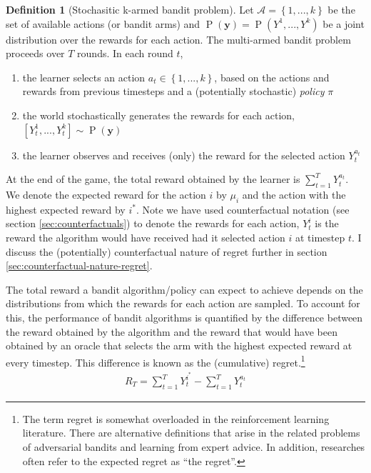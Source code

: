 \documentclass[11pt,a4paper,twoside]{report}
\newcommand{\actionspace}{\mathcal{A}}
\newcommand{\set}[1]{\left\{#1\right\}}
\newcommand{\eqn}[1]{\begin{align}#1\end{align}}
\renewcommand{\P}[1]{\operatorname{P}\left(#1\right)}
\newcommand{\cf}[2]{{#1}^{#2}}
\newcommand{\cfb}[2]{{#1}_t^{#2}} %
\renewcommand{\vec}[1]{\boldsymbol{#1}}
\newcommand{\rawregret}{R_{T}} %
\newcommand{\quotes}[1]{``#1''}
\theoremstyle{plain}
\theoremstyle{definition}
\newtheorem{definition}[theorem]{Definition}
\begin{document}
\vspace{0.5cm}
\begin{definition}[Stochasitic k-armed bandit problem]
Let $\actionspace = \set{1,...,k}$ be the set of available actions (or bandit arms) and $\P{\vec{y}} = \P{\cf{Y}{1},...,\cf{Y}{k}}$ be a joint distribution over the rewards for each action. The multi-armed bandit problem proceeds over $T$ rounds. In each round $t$, 
\begin{enumerate}
\item the learner selects an action $a_{t} \in \set{1,...,k}$, based on the actions and rewards from previous timesteps and a (potentially stochastic) \emph{policy} $\pi$
\item the world stochastically generates the rewards for each action, $[\cfb{Y}{1},...,\cfb{Y}{k}] \sim \P{\vec{y}}$
\item the learner observes and receives (only) the reward for the selected action $\cfb{Y}{a_t}$ 
\end{enumerate}

At the end of the game, the total reward obtained by the learner is $\sum_{t=1}^T \cfb{Y}{a_t}$. We denote the expected reward for the action $i$ by $\mu_i$ and the action with the highest expected reward by $i^*$. Note we have used counterfactual notation (see section \ref{sec:counterfactuals}) to denote the rewards for each action, $\cfb{Y}{i}$ is the reward the algorithm would have received had it selected action $i$ at timestep $t$. I discuss the (potentially) counterfactual nature of regret further in section \ref{sec:counterfactual-nature-regret}.
\end{definition} 


The total reward a bandit algorithm/policy can expect to achieve depends on the distributions from which the rewards for each action are sampled. To account for this, the performance of bandit algorithms is quantified by the difference between the reward obtained by the algorithm and the reward that would have been obtained by an oracle that selects the arm with the highest expected reward at every timestep. This difference is known as the (cumulative) regret.\footnote{The term regret is somewhat overloaded in the reinforcement learning literature. There are alternative definitions that arise in the related problems of adversarial bandits and learning from expert advice. In addition, researches often refer to the expected regret as \quotes{the regret}.}
\eqn{
\label{eqn:raw_regret}
\rawregret = \sum_{t=1}^T \cfb{Y}{i^*} - \sum_{t=1}^T \cfb{Y}{a_t}
}
\end{document}

